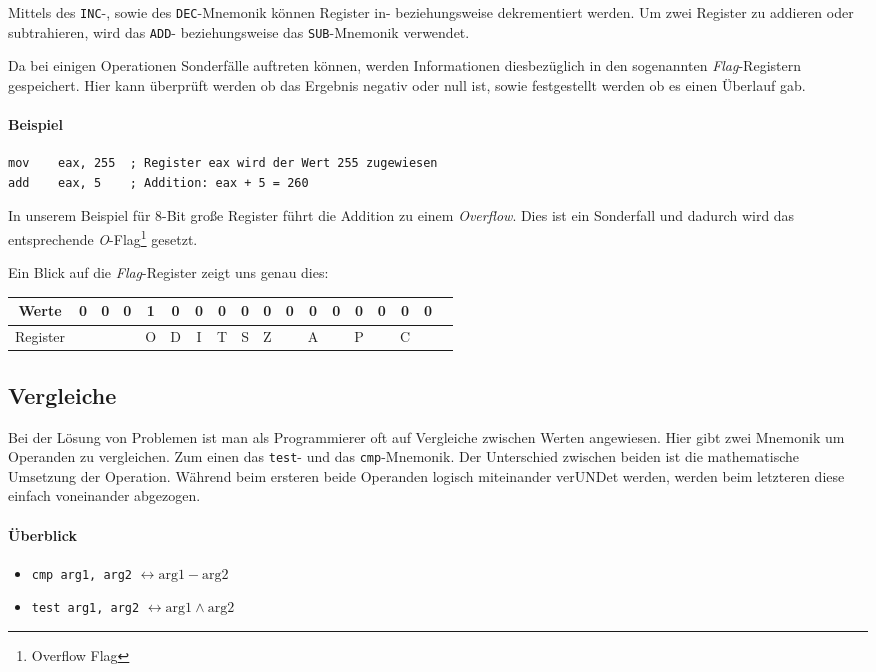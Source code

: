 Mittels des \texttt{INC}-, sowie des \texttt{DEC}-Mnemonik können Register in- beziehungsweise dekrementiert werden. Um zwei Register zu addieren oder subtrahieren, wird das \texttt{ADD}- beziehungsweise das \texttt{SUB}-Mnemonik verwendet.

Da bei einigen Operationen Sonderfälle auftreten können, werden Informationen diesbezüglich in den sogenannten \textit{Flag}-Registern gespeichert.
Hier kann überprüft werden ob das Ergebnis negativ oder null ist, sowie festgestellt werden ob es einen Überlauf gab.

\paragraph{Beispiel\newline}\makebox{}

\begin{lstlisting}
mov    eax, 255  ; Register eax wird der Wert 255 zugewiesen
add    eax, 5    ; Addition: eax + 5 = 260
\end{lstlisting}

In unserem Beispiel für 8-Bit große Register führt die Addition zu einem \textit{Overflow}.
Dies ist ein Sonderfall und dadurch wird das entsprechende \textit{O}-Flag\footnote{Overflow Flag} gesetzt.

Ein Blick auf die \textit{Flag}-Register zeigt uns genau dies:

\begin{tabular}{|c|c|c|c|c|c|c|c|c|c|c|c|c|c|c|c|c|c|}
\hline Werte & 0 & 0 & 0 & 1 & 0 & 0 & 0 & 0 & 0 & 0 & 0 & 0 & 0 & 0 & 0 & 0 \\
\hline Register & & & & O & D & I & T & S & Z & & A & & P & & C & \\
\hline
\end{tabular}

\subsection{Vergleiche}
Bei der Lösung von Problemen ist man als Programmierer oft auf Vergleiche zwischen Werten angewiesen.
Hier gibt zwei Mnemonik um Operanden zu vergleichen. Zum einen das \texttt{test}- und das \texttt{cmp}-Mnemonik.
Der Unterschied zwischen beiden ist die mathematische Umsetzung der Operation. Während beim ersteren beide Operanden logisch miteinander verUNDet werden, werden beim letzteren diese einfach voneinander abgezogen.

\paragraph{Überblick}
\begin{itemize}
    \item \texttt{cmp arg1, arg2} $\leftrightarrow \text{arg1} - \text{arg2}$

    \item \texttt{test arg1, arg2} $\leftrightarrow \text{arg1} \wedge \text{arg2}$
\end{itemize}

